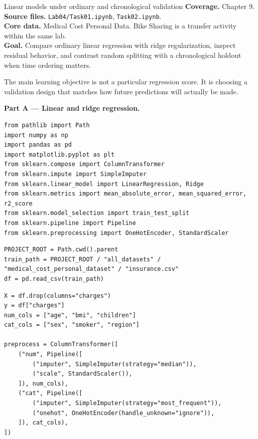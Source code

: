 
\begin{labproject}{Linear models under ordinary and chronological validation}
\textbf{Coverage.} Chapter 9.\\
\textbf{Source files.} \texttt{Lab04/Task01.ipynb}, \texttt{Task02.ipynb}.\\
\textbf{Core data.} Medical Cost Personal Data. Bike Sharing is a transfer activity within the same lab.\\
\textbf{Goal.} Compare ordinary linear regression with ridge regularization, inspect residual behavior, and contrast random splitting with a chronological holdout when time ordering matters.

\begin{labmode}
The main learning objective is not a particular regression score. It is choosing a validation design that matches how future predictions will actually be made.
\end{labmode}

\medskip\noindent\textbf{Part A --- Linear and ridge regression.}\par
\begin{lstlisting}[style=mlpython]
from pathlib import Path
import numpy as np
import pandas as pd
import matplotlib.pyplot as plt
from sklearn.compose import ColumnTransformer
from sklearn.impute import SimpleImputer
from sklearn.linear_model import LinearRegression, Ridge
from sklearn.metrics import mean_absolute_error, mean_squared_error, r2_score
from sklearn.model_selection import train_test_split
from sklearn.pipeline import Pipeline
from sklearn.preprocessing import OneHotEncoder, StandardScaler
\end{lstlisting}

\begin{lstlisting}[style=mlpython]
PROJECT_ROOT = Path.cwd().parent
train_path = PROJECT_ROOT / "all_datasets" / "medical_cost_personal_dataset" / "insurance.csv"
df = pd.read_csv(train_path)
\end{lstlisting}

\begin{lstlisting}[style=mlpython]
X = df.drop(columns="charges")
y = df["charges"]
num_cols = ["age", "bmi", "children"]
cat_cols = ["sex", "smoker", "region"]

preprocess = ColumnTransformer([
    ("num", Pipeline([
        ("imputer", SimpleImputer(strategy="median")),
        ("scale", StandardScaler()),
    ]), num_cols),
    ("cat", Pipeline([
        ("imputer", SimpleImputer(strategy="most_frequent")),
        ("onehot", OneHotEncoder(handle_unknown="ignore")),
    ]), cat_cols),
])


\end{lstlisting}
\end{labproject}
